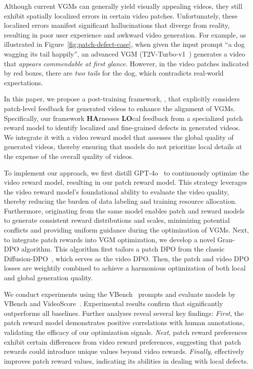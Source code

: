 Although current VGMs can generally yield visually appealing videos, they still exhibit spatially localized errors in certain video patches. 
Unfortunately, these localized errors manifest significant hallucinations that diverge from reality, resulting in poor user experience and awkward video generation. 
For example, as illustrated in Figure~\ref{fig:patch-defect-case}, when given the input prompt ``a dog wagging its tail happily'', an advanced VGM (T2V-Turbo-v1~\cite{t2v-turbo}) generates a video that \textit{appears commendable at first glance}. However, in the video patches indicated by red boxes, there are \textit{two tails} for the dog, which contradicts real-world expectations. 

In this paper, we propose a post-training framework, \ours{}, that explicitly considers patch-level feedback for generated videos to enhance the alignment of VGMs. 
Specifically, our framework \textbf{HA}rnesses \textbf{LO}cal feedback from a specialized patch reward model to identify localized and fine-grained defects in generated videos. 
We integrate it with a video reward model that assesses the global quality of generated videos, thereby ensuring that models do not prioritize local details at the expense of the overall quality of videos.

To implement our approach, we first distill GPT-4o~\cite{GPT-4} to continuously optimize the video reward model, resulting in our patch reward model. This strategy leverages the video reward model's foundational ability to evaluate the video quality, thereby reducing the burden of data labeling and training resource allocation. Furthermore, originating from the same model enables patch and reward models to generate consistent reward distributions and scales, minimizing potential conflicts and providing uniform guidance during the optimization of VGMs. 
Next, to integrate patch rewards into VGM optimization, we develop a novel Gran-DPO algorithm. This algorithm first tailors a patch DPO from the classic Diffusion-DPO~\cite{DMDPO}, which serves as the video DPO. Then, the patch and video DPO losses are weightily combined to achieve a harmonious optimization of both local and global generation quality.

We conduct experiments using the VBench~\cite{vbench} prompts and evaluate models by VBench and VideoScore~\cite{VideoScore}. Experimental results confirm that \ours{} significantly outperforms all baselines. Further analyses reveal several key findings: \textit{First}, the patch reward model demonstrates positive correlations with human annotations, validating the efficacy of our optimization signals. \textit{Next}, patch reward preferences exhibit certain differences from video reward preferences, suggesting that patch rewards could introduce unique values beyond video rewards. 
\textit{Finally}, \ours{} effectively improves patch reward values, indicating its abilities in dealing with local defects.

